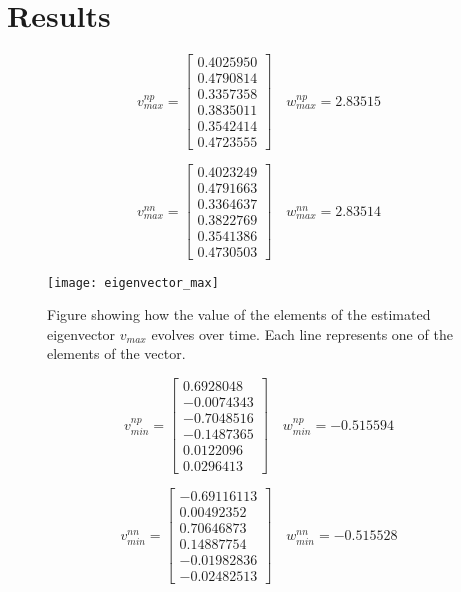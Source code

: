 \section{Results}
\label{sec:results}

\begin{equation*}
v_{max}^{np} = \begin{bmatrix}
	0.4025950 \\
	0.4790814 \\
	0.3357358 \\
    0.3835011 \\
    0.3542414 \\
    0.4723555
\end{bmatrix} \quad w_{max}^{np} =  2.83515
\end{equation*}

\begin{equation*}
v_{max}^{nn} = \begin{bmatrix}
	0.4023249 \\
	0.4791663 \\
	0.3364637 \\
	0.3822769 \\
	0.3541386 \\
	0.4730503
\end{bmatrix} \quad w_{max}^{nn} = 2.83514
\end{equation*}

 \begin{figure}[htbp]
 	\centering
 	\texttt{[image: eigenvector\_max]}
 	\caption{Figure showing how the value of the elements of the estimated eigenvector $v_{max}$ evolves over time. Each line represents one of the elements of the vector.}
 	\label{fig:eigenvector_max}
 \end{figure}
 
 \begin{equation*}
	 v_{min}^{np} = \begin{bmatrix}
	  0.6928048 \\
	 -0.0074343 \\
	 -0.7048516 \\ 
	 -0.1487365 \\
	 0.0122096 \\
	 0.0296413
	 \end{bmatrix} \quad w_{min}^{np} = -0.515594
 \end{equation*}
 
 \begin{equation*}
	 v_{min}^{nn} = \begin{bmatrix}
	  -0.69116113  \\
	  0.00492352  \\
	  0.70646873  \\
	  0.14887754 \\
	  -0.01982836 \\
	  -0.02482513	  
	 \end{bmatrix} \quad w_{min}^{nn} = -0.515528	 
 \end{equation*}



